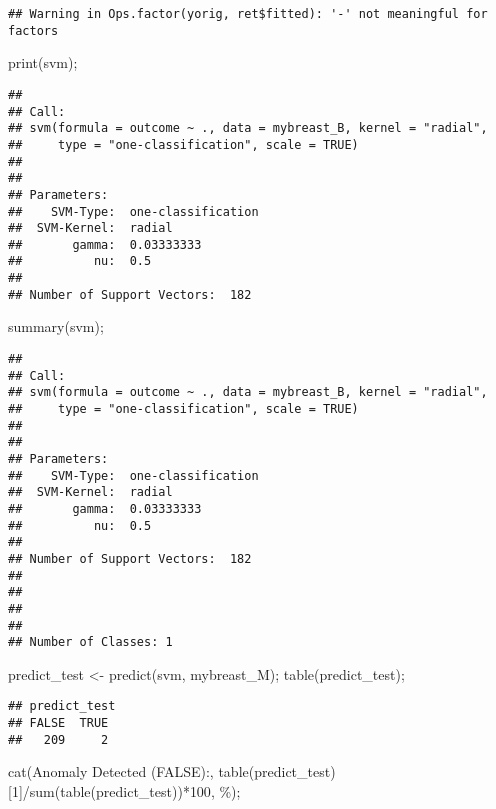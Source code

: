 \documentclass[
]{article}
\newenvironment{Shaded}{\begin{snugshade}}{\end{snugshade}}
\newcommand{\DecValTok}[1]{\textcolor[rgb]{0.00,0.00,0.81}{#1}}
\newcommand{\FunctionTok}[1]{\textcolor[rgb]{0.00,0.00,0.00}{#1}}
\newcommand{\NormalTok}[1]{#1}
\newcommand{\OtherTok}[1]{\textcolor[rgb]{0.56,0.35,0.01}{#1}}
\newcommand{\SpecialCharTok}[1]{\textcolor[rgb]{0.00,0.00,0.00}{#1}}
\newcommand{\StringTok}[1]{\textcolor[rgb]{0.31,0.60,0.02}{#1}}
\begin{document}
\begin{verbatim}
## Warning in Ops.factor(yorig, ret$fitted): '-' not meaningful for factors
\end{verbatim}

\begin{Shaded}
\begin{Highlighting}[]
\FunctionTok{print}\NormalTok{(svm);}
\end{Highlighting}
\end{Shaded}

\begin{verbatim}
## 
## Call:
## svm(formula = outcome ~ ., data = mybreast_B, kernel = "radial", 
##     type = "one-classification", scale = TRUE)
## 
## 
## Parameters:
##    SVM-Type:  one-classification 
##  SVM-Kernel:  radial 
##       gamma:  0.03333333 
##          nu:  0.5 
## 
## Number of Support Vectors:  182
\end{verbatim}

\begin{Shaded}
\begin{Highlighting}[]
\FunctionTok{summary}\NormalTok{(svm);}
\end{Highlighting}
\end{Shaded}

\begin{verbatim}
## 
## Call:
## svm(formula = outcome ~ ., data = mybreast_B, kernel = "radial", 
##     type = "one-classification", scale = TRUE)
## 
## 
## Parameters:
##    SVM-Type:  one-classification 
##  SVM-Kernel:  radial 
##       gamma:  0.03333333 
##          nu:  0.5 
## 
## Number of Support Vectors:  182
## 
## 
## 
## 
## Number of Classes: 1
\end{verbatim}

\begin{Shaded}
\begin{Highlighting}[]
\NormalTok{predict\_test }\OtherTok{\textless{}{-}} \FunctionTok{predict}\NormalTok{(svm, mybreast\_M);}
\FunctionTok{table}\NormalTok{(predict\_test);}
\end{Highlighting}
\end{Shaded}

\begin{verbatim}
## predict_test
## FALSE  TRUE 
##   209     2
\end{verbatim}

\begin{Shaded}
\begin{Highlighting}[]
\FunctionTok{cat}\NormalTok{(}\StringTok{\textquotesingle{}Anomaly Detected (FALSE):\textquotesingle{}}\NormalTok{, }\FunctionTok{table}\NormalTok{(predict\_test)[}\DecValTok{1}\NormalTok{]}\SpecialCharTok{/}\FunctionTok{sum}\NormalTok{(}\FunctionTok{table}\NormalTok{(predict\_test))}\SpecialCharTok{*}\DecValTok{100}\NormalTok{, }\StringTok{\textquotesingle{} \%\textquotesingle{}}\NormalTok{);}
\end{Highlighting}
\end{Shaded}
\end{document}
